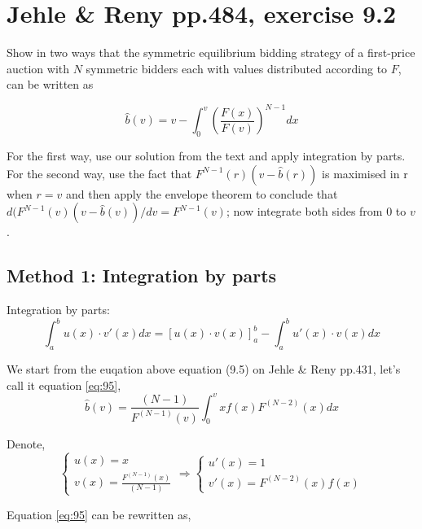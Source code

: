 \documentclass{article}
\begin{document}
\newpage

\section{Jehle \& Reny pp.484, exercise 9.2}

Show in two ways that the symmetric equilibrium bidding strategy of a first-price auction with $N$
symmetric bidders each with values distributed according to $F$, can be written as


$$\hat{b}(v) = v -\int_{0}^{v} \left(\frac{F(x)}{F(v)}\right)^{N-1} dx$$

For the first way, use our solution from the text and apply integration by parts. For the second
way, use the fact that $F^{N-1}(r)(v - \hat{b}(r))$ is maximised in r when $r = v$ and then apply the envelope
theorem to conclude that $d(F^{N-1}(v)(v - \hat{b}(v))/dv = F^{N-1}(v)$; now integrate both sides from $0$ to $v$.

\subsection*{Method 1: Integration by parts}

\begin{mdframed}[backgroundcolor=blue!20,linecolor=white]
Integration by parts: 
$$\int_a^b u(x) \cdot v'(x) dx = \left[u(x) \cdot v(x)\right]_a^b - \int_a^b u'(x) \cdot v(x) dx $$
\end{mdframed}

We start from the euqation above equation (9.5) on Jehle \& Reny pp.431, let's call it equation \ref{eq:95},
\begin{equation}
\hat{b}(v)= \frac{(N-1)}{F^{(N-1)}(v)} \int_0^{v}xf(x)F^{(N-2)}(x)dx
\label{eq:95}   
\end{equation}

Denote,
\begin{equation}
    \begin{cases}
u(x)=x  \\
v(x)= \frac{F^{(N-1)}(x)}{(N-1)}
    \end{cases}
\Rightarrow
	\begin{cases}
 u'(x)= 1 \\
 v'(x)= F^{(N-2)}(x)f(x)
	\end{cases}
\nonumber
\end{equation}

Equation \ref{eq:95} can be rewritten as,
\end{document}
